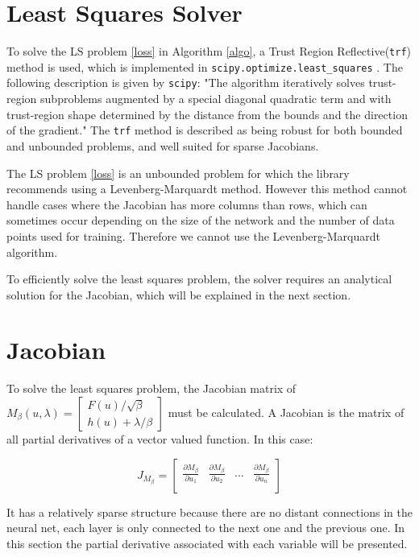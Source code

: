 \section{Least Squares Solver}
To solve the LS problem \ref{loss} in Algorithm \ref{algo}, a Trust Region Reflective(\texttt{trf}) method is used, which is implemented in \texttt{scipy.optimize.least\_squares} \cite{scipyls}. The following description is given by \texttt{scipy}: "The algorithm iteratively solves trust-region subproblems augmented by a special diagonal quadratic term and with trust-region shape determined by the distance from the bounds and the direction of the gradient." The \texttt{trf} method is described as being robust for both bounded and unbounded problems, and well suited for sparse Jacobians. 

The LS problem \ref{loss} is an unbounded problem for which the library recommends using a Levenberg-Marquardt method. However this method cannot handle cases where the Jacobian has more columns than rows, which can sometimes occur depending on the size of the network and the number of data points used for training. Therefore we cannot use the Levenberg-Marquardt algorithm.

To efficiently solve the least squares problem, the solver requires an analytical solution for the Jacobian, which will be explained in the next section.

\section{Jacobian}

To solve the least squares problem, the Jacobian matrix of $M_{\beta}(u,\lambda) = \begin{bmatrix} F(u)/\sqrt{\beta} \\ h(u) + \lambda/\beta \end{bmatrix}$ must be calculated. A Jacobian is the matrix of all partial derivatives of a vector valued function. In this case:

\begin{equation}
J_{M_{\beta}} = 
\begin{bmatrix}
\frac{\partial{M_{\beta}}}{\partial u_1} & 
\frac{\partial{M_{\beta}}}{\partial u_2} & ... & 
\frac{\partial{M_{\beta}}}{\partial u_n} \\
\end{bmatrix}
\end{equation}

 It has a relatively sparse structure because there are no distant connections in the neural net, each layer is only connected to the next one and the previous one. In this section the partial derivative associated with each variable will be presented.
 
